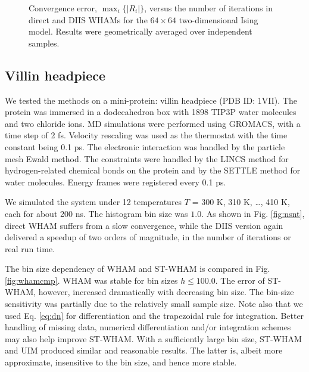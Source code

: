 \documentclass[reprint,aip,jcp,superscriptaddress]{revtex4-1}
\begin{document}
\begin{figure}[h]
  \caption{
    \label{fig:is2trace}
    Convergence error, $\max_i \{ |R_i| \}$,
    versus the number of iterations
    in direct and DIIS WHAMs
    for the $64\times64$ two-dimensional Ising model.
    Results were geometrically averaged over independent samples.
  }
\end{figure}





\subsection{\label{sec:results_villin}
Villin headpiece}



We tested the methods on a mini-protein:
villin headpiece\cite{duan1998}
(PDB ID: 1VII).
%
The protein was immersed in
a dodecahedron box with 1898 TIP3P water molecules and two chloride ions.
%
MD simulations were performed
using GROMACS\cite{
berendsen1995, *lindahl2001, *vanderspoel2005, *hess2008},
with a time step of 2 fs.
%
Velocity rescaling\cite{bussi2007}
was used as the thermostat with
the time constant being 0.1 ps.
%
The electronic interaction was
handled by the particle mesh Ewald method\cite{
essmann1995}.
%
The constraints were handled by the LINCS method\cite{
hess1997}
for hydrogen-related chemical bonds on the protein
and by the SETTLE method\cite{
miyamoto1992}
for water molecules.
%
Energy frames were registered every 0.1 ps.



We simulated the system under 12 temperatures
$T$ = 300 K, 310 K, \dots, 410 K,
each for about 200 ns.
%
The histogram bin size was $1.0$.
%
As shown in Fig. \ref{fig:nsnt},
direct WHAM suffers from a slow convergence,
while the DIIS version again
delivered a speedup of two orders of magnitude,
in the number of iterations or real run time.



The bin size dependency of WHAM and ST-WHAM
is compared in Fig. \ref{fig:whamcmp}.
%
WHAM was stable for bin sizes $h \le 100.0$.
%
The error of ST-WHAM, however,
increased dramatically with decreasing bin size.
%
The bin-size sensitivity was partially due to
the relatively small sample size.
%
Note also that
we used Eq. \eqref{eq:dn} for differentiation
and the trapezoidal rule for integration.
%
Better handling of missing data,
numerical differentiation
and/or integration schemes\cite{
kim2011} may also help improve ST-WHAM.
%
With a sufficiently large bin size,
ST-WHAM and UIM produced similar and reasonable results.
%
The latter is, albeit more approximate,
insensitive to the bin size, and hence more stable.
\end{document}
